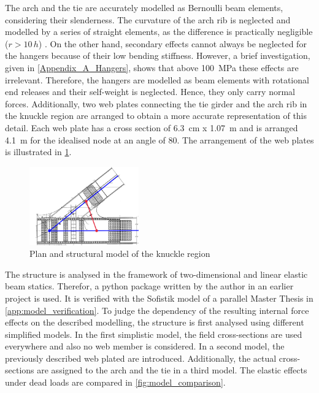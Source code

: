 The arch and the tie are accurately modelled as Bernoulli beam elements, considering their slenderness. The curvature of the arch rib is neglected and modelled by a series of straight elements, as the difference is practically negligible ($r>10\,h$) \cite{MARTI}. On the other hand, secondary effects cannot always be neglected for the hangers because of their low bending stiffness. However, a brief investigation, given in \cref{Appendix_A_Hangers}, shows that above \SI{100}{MPa} these effects are irrelevant. Therefore, the hangers are modelled as beam elements with rotational end releases and their self-weight is neglected. Hence, they only carry normal forces. Additionally, two web plates connecting the tie girder and the arch rib in the knuckle region are arranged to obtain a more accurate representation of this detail. Each web plate has a cross section of \SI{6.3}{cm} x \SI{1.07}{m} and is arranged \SI{4.1}{m} for the idealised node at an angle of 80\degree. The arrangement of the web plates is illustrated in \cref{fig:knuckle_region}.


\begin{figure}[H]
    \centering
    \includegraphics[width=0.42\textwidth]{overleaf/Pictures/Knuckle region.png}
    \caption{Plan and structural model of the knuckle region}
    \label{fig:knuckle_region}
\end{figure}

The structure is analysed in the framework of two-dimensional and linear elastic beam statics. Therefor, a python package written by the author in an earlier project is used. It is verified with the Sofistik model of a parallel Master Thesis in \cref{app:model_verification}. To judge the dependency of the resulting internal force effects on the described modelling, the structure is first analysed using different simplified models. In the first simplistic model, the field cross-sections are used everywhere and also no web member is considered. In a second model, the previously described web plated are introduced. Additionally, the actual cross-sections are assigned to the arch and the tie in a third model. The elastic effects under dead loads are compared in \cref{fig:model_comparison}.

